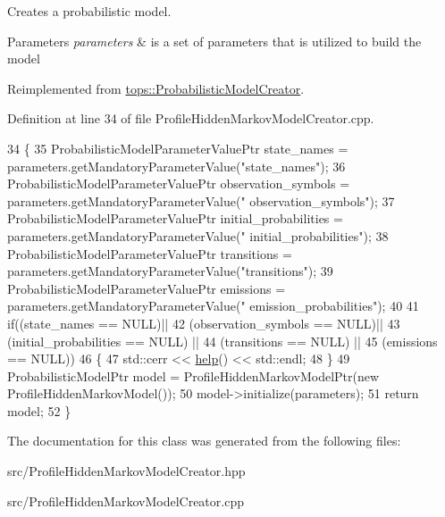 Creates a probabilistic model. 


\begin{DoxyParams}{Parameters}
{\em parameters} & is a set of parameters that is utilized to build the model \\
\hline
\end{DoxyParams}


Reimplemented from \hyperlink{classtops_1_1ProbabilisticModelCreator_afed6c8ffa45fff446bdaa8b533da8f7c}{tops\+::\+Probabilistic\+Model\+Creator}.



Definition at line 34 of file Profile\+Hidden\+Markov\+Model\+Creator.\+cpp.


\begin{DoxyCode}
34                                                                                                            
          \{
35     ProbabilisticModelParameterValuePtr state\_names = parameters.getMandatoryParameterValue(\textcolor{stringliteral}{"state\_names"});
36     ProbabilisticModelParameterValuePtr observation\_symbols = parameters.getMandatoryParameterValue(\textcolor{stringliteral}{"
      observation\_symbols"});
37     ProbabilisticModelParameterValuePtr initial\_probabilities = parameters.getMandatoryParameterValue(\textcolor{stringliteral}{"
      initial\_probabilities"});
38     ProbabilisticModelParameterValuePtr transitions = parameters.getMandatoryParameterValue(\textcolor{stringliteral}{"transitions"});
39     ProbabilisticModelParameterValuePtr emissions = parameters.getMandatoryParameterValue(\textcolor{stringliteral}{"
      emission\_probabilities"});
40 
41     \textcolor{keywordflow}{if}((state\_names == NULL)||
42        (observation\_symbols == NULL)||
43        (initial\_probabilities == NULL) ||
44        (transitions == NULL) ||
45        (emissions == NULL))
46       \{
47         std::cerr << \hyperlink{classtops_1_1ProfileHiddenMarkovModelCreator_afba1445cb46e25d3e52c06a0746fa7ce}{help}() << std::endl;
48       \}
49     ProbabilisticModelPtr model = ProfileHiddenMarkovModelPtr(\textcolor{keyword}{new} ProfileHiddenMarkovModel());
50     model->initialize(parameters);
51     \textcolor{keywordflow}{return} model;
52   \}
\end{DoxyCode}


The documentation for this class was generated from the following files\+:\begin{DoxyCompactItemize}
\item 
src/Profile\+Hidden\+Markov\+Model\+Creator.\+hpp\item 
src/Profile\+Hidden\+Markov\+Model\+Creator.\+cpp\end{DoxyCompactItemize}
